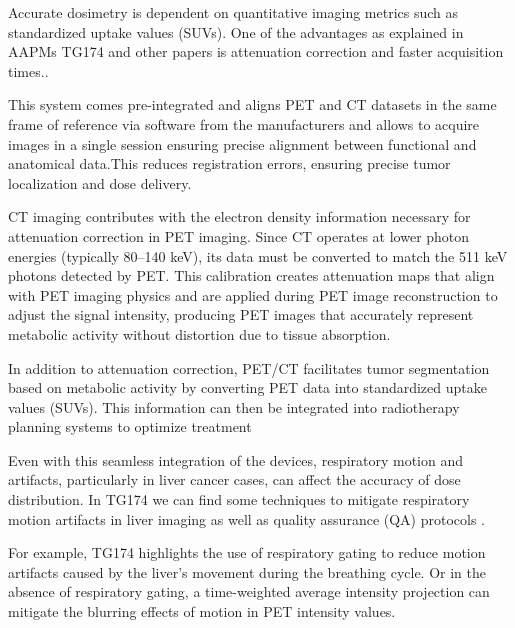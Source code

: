 \begin{multicols}{2}
Accurate dosimetry is dependent on quantitative imaging metrics such as standardized uptake values (SUVs). One of the advantages as explained in AAPMs TG174 and other papers is attenuation correction and faster acquisition times.\cite{knesaurek2018,TG174}. 

This system comes pre-integrated and aligns PET and CT datasets in the same frame of reference via software from the manufacturers and allows to acquire images in a single session ensuring precise alignment between functional and anatomical data.This reduces registration errors, ensuring precise tumor localization and dose delivery. 

CT imaging contributes with the electron density information necessary for attenuation correction in PET imaging. Since CT operates at lower photon energies (typically 80–140 keV), its data must be converted to match the 511 keV photons detected by PET. This calibration creates attenuation maps that align with PET imaging physics and are applied during PET image reconstruction to adjust the signal intensity, producing PET images that accurately represent metabolic activity without distortion due to tissue absorption.\cite{knesaurek2018, TG174}

In addition to attenuation correction, PET/CT facilitates tumor segmentation based on metabolic activity by converting PET data into standardized uptake values (SUVs). This information can then be integrated into radiotherapy planning systems to optimize treatment

Even with this seamless integration of the devices, respiratory motion and artifacts, particularly in liver cancer cases, can affect the accuracy of dose distribution. In TG174 we can find some techniques to mitigate respiratory motion artifacts in liver imaging as well as quality assurance (QA) protocols \cite{TG174}.

For example, TG174 highlights the use of respiratory gating to reduce motion artifacts caused by the liver’s movement during the breathing cycle. Or in the absence of respiratory gating, a time-weighted average intensity projection can mitigate the blurring effects of motion in PET intensity values.


\end{multicols}
